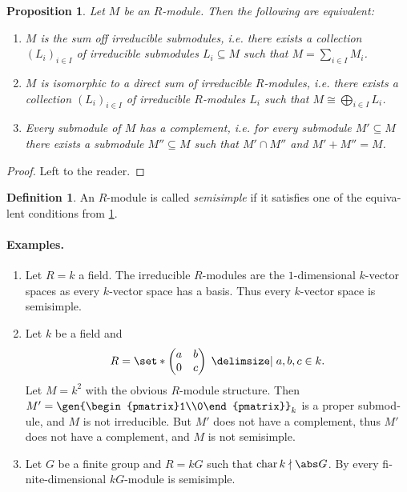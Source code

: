 \documentclass[12pt,a4paper]{scrartcl}
\theoremstyle{cplain}
\theoremstyle{cplain}
\theoremstyle{cplain}
\newtheorem{prop}[thmcounter]{Proposition}
\theoremstyle{definition}
\newtheorem*{deff}{Definition}
\begin{document}
\begin{otherlanguage}{english}
\begin{prop} \label{prop:V.1}
  Let $M$ be an $R$-module. Then the following are equivalent:
  \begin{enumerate}
    \item $M$ is the sum off irreducible submodules, i.e. there exists a collection $(L_i)_{i\in I}$ of irreducible submodules $L_i \subseteq M$ such that $M= \sum_{i\in I}M_i$.
    \item $M$ is isomorphic to a direct sum of irreducible $R$-modules, i.e. there exists a collection $(L_i)_{i\in I}$ of irreducible $R$-modules $L_i$ such that $M \cong \bigoplus_{i\in I}L_i$.
    \item Every submodule of $M$ has a complement, i.e. for every submodule $M' \subseteq M$ there exists a submodule $M'' \subseteq M$ such that $M' \cap M''$ and $M' + M'' = M$.
  \end{enumerate}
\end{prop}
\begin{proof}
  Left to the reader.
\end{proof}

\begin{deff}
  An $R$-module is called \emph{semisimple} if it satisfies one of the equivalent conditions from \cref{prop:V.1}.
\end{deff}

\paragraph{Examples.}
\begin{enumerate}
  \item Let $R=k$ a field. The irreducible $R$-modules are the $1$-dimensional $k$-vector spaces as every $k$-vector space has a basis. Thus every $k$-vector space is semisimple.
  \item Let $k$ be a field and \[R=\set*{\begin{pmatrix}a&b\\0&c\end{pmatrix} \given a,b,c\in k}.\] Let $M=k^2$ with the obvious $R$-module structure. Then $M' = \gen{\begin{pmatrix}1\\0\end{pmatrix}}_k$ is a proper submodule, and $M$ is not irreducible. But $M'$ does not have a complement, thus $M'$ does not have a complement, and $M$ is not semisimple.
  \item Let $G$ be a finite group and $R=kG$ such that $\chr k \nmid \abs G$. By  every finite-dimensional $kG$-module is semisimple.
\end{enumerate}


\end{otherlanguage}
\end{document}
